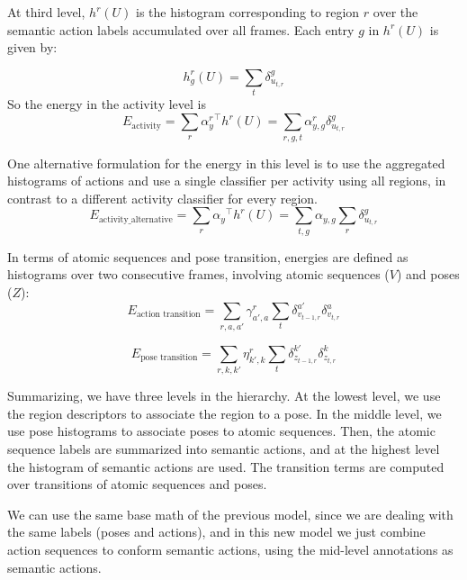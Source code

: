 \documentclass[10pt,letterpaper]{article}
\newcommand{\+}[1]{\ensuremath{{\boldsymbol #1}}}
\begin{document}
At third level, $h^{r}(U)$ is the histogram corresponding to region $r$ over
the semantic action labels accumulated over all frames. Each entry $g$ in $h^{r}(U)$ is
given by:

\begin{equation}
h_g^{r}(U) = \sum_{t} \delta_{u_{t,r}}^g
\end{equation}
So the energy in the activity level is
\begin{equation}
E_{\text{activity}} = \sum_{r} {\alpha^r_{y}}^\top h^{r}(U) = \sum_{r,g,t}  \alpha^r_{y,g} \delta_{u_{t,r}}^g
\end{equation}

One alternative formulation for the energy in this level is to use the aggregated histograms of actions and use a single classifier per activity using all regions, in contrast to a different activity classifier for every region.
\begin{equation}
E_{\text{activity\_alternative}} = \sum_{r} {\alpha_{y}}^\top h^{r}(U) = \sum_{t,g}  \alpha_{y,g} \sum_r \delta_{u_{t,r}}^g
\end{equation}

In terms of atomic sequences and pose transition, energies are defined
as histograms over two consecutive frames,
involving atomic sequences ($V$) and poses ($Z$):
\begin{equation}
E_{\text{action transition}} = \sum_{r,a,a'}  \gamma^r_{a',a} \sum_{t} \delta_{v_{t-1,r}}^{a'}\delta_{v_{t,r}}^a 
\end{equation}

\begin{equation}
E_{\text{pose transition}} =\sum_{r,k,k'}  \eta^r_{k',k}\sum_{t}\delta_{z_{t-1,r}}^{k'}\delta_{z_{t,r}}^{k}
\end{equation}

Summarizing, we have three levels in the hierarchy. At the lowest level, we use the region descriptors to associate the region to a pose. In the middle level, we use pose histograms to associate poses to atomic sequences. Then, the atomic sequence labels are summarized into semantic actions, and at the highest level the histogram of semantic actions are used. The transition terms are computed over transitions of atomic sequences and poses. 
 \vspace{1em}

We can use the same base math of the previous model, since we are dealing with the same labels (poses and actions), and in this new model we just combine action sequences to conform semantic actions, using the mid-level annotations as semantic actions. 
\vspace{1em}
\end{document}
